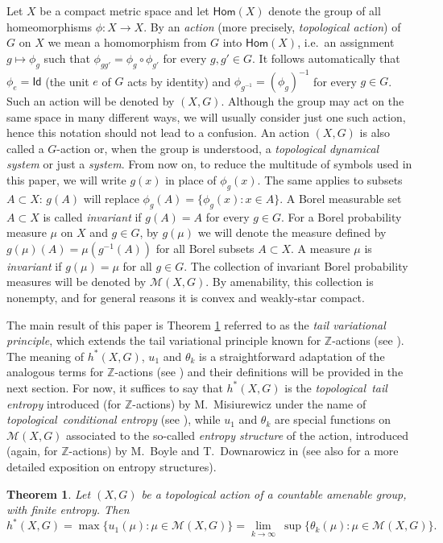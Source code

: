 \documentclass[12pt]{amsart}
\newtheorem{theorem}{Theorem}[section]
\theoremstyle{definition}
\numberwithin{equation}{section}
\def \Z {\mathbb Z}
\def \M {\mathcal M}
\def \tl {topological}
\def \inv {invariant}
\def \Hom {\mathsf{Hom}}
\def \id {\mathsf{Id}}
\def \Z {\mathbb Z}
\def \M {\mathcal M}
\def \tl {topological}
\def \inv {invariant}
\def \Hom {\mathsf{Hom}}
\def \id {\mathsf{Id}}
\begin{document}
Let $X$ be a compact metric space and let $\Hom(X)$ denote the group of all homeomorphisms $\phi:X\to X$. By an \emph{action} (more precisely, \emph{topological action}) of $G$ on $X$ we mean a homomorphism from $G$ into $\Hom(X)$, i.e.\ an assignment $g\mapsto \phi_g$ such that $\phi_{gg'} = \phi_g\circ\phi_{g'}$ for every $g,g'\in G$. It follows automatically that $\phi_e=\id$ (the unit $e$ of $G$ acts by identity) and $\phi_{g^{-1}}=(\phi_g)^{-1}$ for every $g\in G$. Such an action will be denoted by $(X, G)$. Although the group may act on the same space in many different ways, we will usually consider just one such action, hence this notation should not lead to a confusion. An action $(X,G)$ is also called a {$G$-action} or, when the group is understood, a \emph{topological dynamical system} or just a \emph{system}. From now on, to reduce the multitude of symbols used in this paper, we will write $g(x)$ in place of $\phi_g(x)$. The same applies to subsets $A\subset X$: $g(A)$ will replace $\phi_g(A)=\{\phi_g(x):x\in A\}$. A Borel measurable set $ A\subset X$ is called \emph{\inv} if $g(A)=A$ for every $g\in G$. For a Borel probability measure $\mu$ on $X$ and $g\in G$, by $g(\mu)$ we will denote the measure defined by $g(\mu)(A)=\mu(g^{-1}(A))$ for all Borel subsets $A\subset X$. A measure $\mu$ is \emph{invariant} if $g(\mu) = \mu$ for all $g\in G$. The collection of invariant Borel probability measures will be denoted by $\M(X,G)$. By amenability, this collection is nonempty, and for general reasons it is convex and weakly-star compact.


The main result of this paper is Theorem \ref{tail} referred to as the \emph{tail variational principle}, which extends the tail variational principle known for $\mathbb{Z}$-actions (see \cite{D2005}). The meaning of $h^*(X,G)$, $u_1$ and $\theta_k$ is a straightforward adaptation of the analogous terms for $\Z$-actions (see \cite{D2005}) and their definitions will be provided in the next section.
For now, it suffices to say that $h^*(X,G)$ is the \emph{\tl\ tail entropy} introduced (for $\Z$-actions) by M.\ Misiurewicz under the name of \emph{\tl\ conditional entropy} (see \cite{Mi1}), while $u_1$ and $\theta_k$ are special functions on $\M(X,G)$ associated to the so-called \emph{entropy structure} of the action, introduced (again, for $\Z$-actions) by M.\ Boyle and T.\ Downarowicz in \cite{BD} (see also \cite{D2005} for a more detailed exposition on entropy structures).

\begin{theorem}\label{tail}
Let $(X,G)$ be a topological action of a countable amenable group, with finite entropy. Then
$$
h^* (X,G)= \max \{u_1 (\mu): \mu\in \M(X,G)\}= \lim_{k\rightarrow \infty}\ \sup\{\theta_k (\mu):\mu\in\M(X,G)\}.
$$
\end{theorem}
\end{document}
